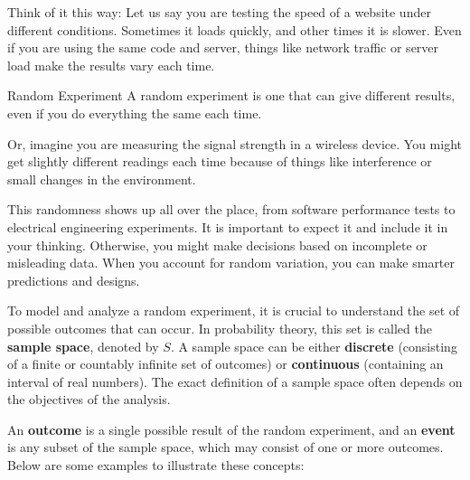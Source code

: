 Think of it this way: Let us say you are testing the speed of a website under different conditions. Sometimes it loads quickly, and other times it is slower. Even if you are using the same code and server, things like network traffic or server load make the results vary each time. 

\begin{definition}{Random Experiment}
    A random experiment is one that can give different results, even if you do everything the same each time.
\end{definition}

Or, imagine you are measuring the signal strength in a wireless device. You might get slightly different readings each time because of things like interference or small changes in the environment.

This randomness shows up all over the place, from software performance tests to electrical engineering experiments. It is important to expect it and include it in your thinking. Otherwise, you might make decisions based on incomplete or misleading data. When you account for random variation, you can make smarter predictions and designs.

To model and analyze a random experiment, it is crucial to understand the set of possible outcomes that can occur. In probability theory, this set is called the \textbf{sample space}, denoted by \( S \). A sample space can be either \textbf{discrete} (consisting of a finite or countably infinite set of outcomes) or \textbf{continuous} (containing an interval of real numbers). The exact definition of a sample space often depends on the objectives of the analysis.

An \textbf{outcome} is a single possible result of the random experiment, and an \textbf{event} is any subset of the sample space, which may consist of one or more outcomes. Below are some examples to illustrate these concepts:


